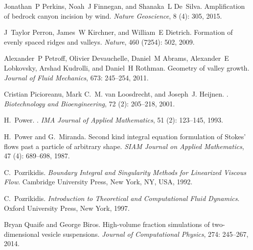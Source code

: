 \documentclass[preprint, 10pt]{elsarticle}
\begin{document}
\begin{thebibliography}{72}
Jonathan~P Perkins, Noah~J Finnegan, and Shanaka~L De~Silva.
\newblock Amplification of bedrock canyon incision by wind.
\newblock \emph{Nature Geoscience}, 8 (4): 305, 2015.

J~Taylor Perron, James~W Kirchner, and William~E Dietrich.
\newblock Formation of evenly spaced ridges and valleys.
\newblock \emph{Nature}, 460 (7254): 502, 2009.

Alexander~P Petroff, Olivier Devauchelle, Daniel~M Abrams, Alexander~E
  Lobkovsky, Arshad Kudrolli, and Daniel~H Rothman.
\newblock Geometry of valley growth.
\newblock \emph{Journal of Fluid Mechanics}, 673: 245--254, 2011.

Cristian Picioreanu, Mark C.~M. van Loosdrecht, and Joseph~J. Heijnen.
.
\newblock \emph{Biotechnology and Bioengineering}, 72 (2):
  205--218, 2001.

H.~Power.
.
\newblock \emph{IMA Journal of Applied Mathematics}, 51 (2):
  123--145, 1993.

H.~Power and G.~Miranda.
\newblock Second kind integral equation formulation of Stokes' flows past a
  particle of arbitrary shape.
\newblock \emph{SIAM Journal on Applied Mathematics}, 47 (4):
  689--698, 1987.

C.~Pozrikidis.
\newblock \emph{{Boundary Integral and Singularity Methods for Linearized
  Viscous Flow}}.
\newblock Cambridge University Press, New York, NY, USA, 1992.

C.~Pozrikidis.
\newblock \emph{Introduction to Theoretical and Computational Fluid Dynamics}.
\newblock Oxford University Press, New York, 1997.

Bryan Quaife and George Biros.
\newblock High-volume fraction simulations of two-dimensional vesicle
  suspensions.
\newblock \emph{Journal of Computational Physics}, 274: 245--267,
  2014.


\end{thebibliography}
\end{document}
